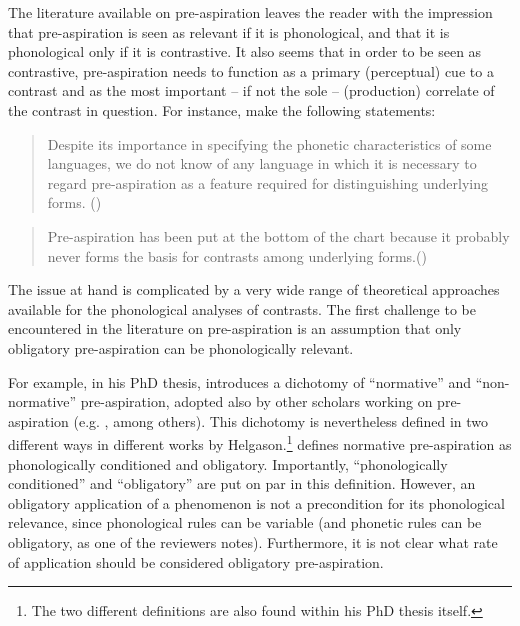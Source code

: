 \documentclass[output=paper]{langscibook}
\begin{document}
The literature available on pre\hyp aspiration leaves the reader with the impression that pre\hyp aspiration is seen as relevant if it is phonological, and that it is phonological only if it is contrastive. It also seems that in order to be seen as contrastive, pre\hyp aspiration needs to function as a primary (perceptual) cue to a contrast and as the most important – if not the sole – (production) correlate of the contrast in question. For instance, \citet{LadefogedMaddieson1996} make the following statements: 

\begin{quote}
Despite its importance in specifying the phonetic characteristics of some languages, we do not know of any language in which it is necessary to regard pre\hyp aspiration as a feature required for distinguishing underlying forms. \hfill\hbox{(\citeyear[73]{LadefogedMaddieson1996})}
\end{quote}

\begin{quote}
Pre-aspiration has been put at the bottom of the chart because it probably never forms the basis for contrasts among underlying forms.\hfill\hbox{(\citeyear[99]{LadefogedMaddieson1996})}
\end{quote}

The issue at hand is complicated by a very wide range of theoretical approaches available for the phonological analyses of contrasts. The first challenge to be encountered in the literature on pre\hyp aspiration is an assumption that only obligatory pre\hyp aspiration can be phonologically relevant.

For example, in his PhD thesis, \citet{Helgason2002} introduces a dichotomy of “normative” and “non-normative” pre-aspiration, adopted also by other scholars working on pre\hyp aspiration (e.g. \citealt{Morris2010}, among others). This dichotomy is nevertheless defined in two different ways in different works by Helgason.\footnote{The two different definitions are also found within his PhD thesis itself.} \textcites[1854]{Helgason1999}[8]{Helgason2002} defines normative pre\hyp aspiration as phonologically conditioned and obligatory. Importantly, “phonologically conditioned” and “obligatory” are put on par in this definition. However, an obligatory application of a phenomenon is not a precondition for its phonological relevance, since phonological rules can be variable (and phonetic rules can be obligatory, as one of the reviewers notes). Furthermore, it is not clear what rate of application should be considered obligatory pre-aspiration.
\end{document}
